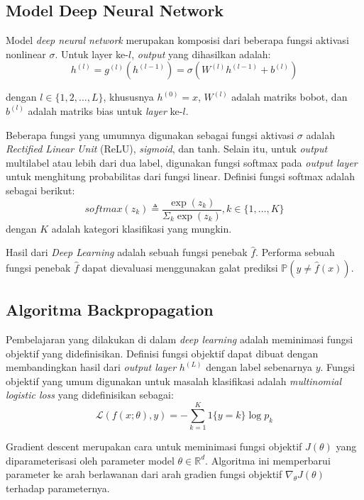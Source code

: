 \subsection{Model Deep Neural Network}
Model \emph{deep neural network} merupakan komposisi dari beberapa fungsi aktivasi nonlinear $\sigma$. Untuk layer ke-$l$, \emph{output} yang dihasilkan adalah:
\begin{equation}
  h^{(l)} = g^{(l)}(h^{(l-1)}) = \sigma(W^{(l)}h^{(l-1)} + b^{(l)})
\end{equation}

dengan $l \in \{1,2,\dots,L\}$, khususnya $h^{(0)} = x$, $W^{(l)}$ adalah matriks bobot, dan $b^{(l)}$ adalah matriks bias untuk \emph{layer} ke-$l$.

Beberapa fungsi yang umumnya digunakan sebagai fungsi aktivasi $\sigma$ adalah \emph{Rectified Linear Unit} (ReLU), \emph{sigmoid}, dan tanh. Selain itu, untuk \emph{output} multilabel atau lebih dari dua label, digunakan fungsi softmax pada \emph{output layer} untuk menghitung probabilitas dari fungsi linear. Definisi fungsi softmax adalah sebagai berikut:
\begin{equation}
  softmax(z_k) \triangleq \frac{\exp(z_k)}{\Sigma_k \exp(z_k)},
  k \in \{1,\dots,K\}
\end{equation}
dengan $K$ adalah kategori klasifikasi yang mungkin.

Hasil dari \emph{Deep Learning} adalah sebuah fungsi penebak $\hat{f}$. Performa sebuah fungsi penebak $\hat{f}$ dapat dievaluasi menggunakan galat prediksi $\mathbb{P}(y \neq \hat{f}(x))$.

\subsection{Algoritma Backpropagation}
Pembelajaran yang dilakukan di dalam \emph{deep learning} adalah meminimasi fungsi objektif yang didefinisikan. Definisi fungsi objektif dapat dibuat dengan membandingkan hasil dari \emph{output layer} $h^{(L)}$ dengan label sebenarnya $y$. Fungsi objektif yang umum digunakan untuk masalah klasifikasi adalah \emph{multinomial logistic loss} yang didefinisikan sebagai:
\begin{equation}
  \mathcal{L}(f(x;\theta),y) = -\sum_{k=1}^K 1\{y=k\} \log p_k
\end{equation}

Gradient descent merupakan cara untuk meminimasi fungsi objektif $J(\theta)$ yang diparameterisasi oleh parameter model $\theta \in \mathbb{R}^d$. Algoritma ini memperbarui parameter ke arah berlawanan dari arah gradien fungsi objektif $\nabla_\theta J(\theta)$ terhadap parameternya.

